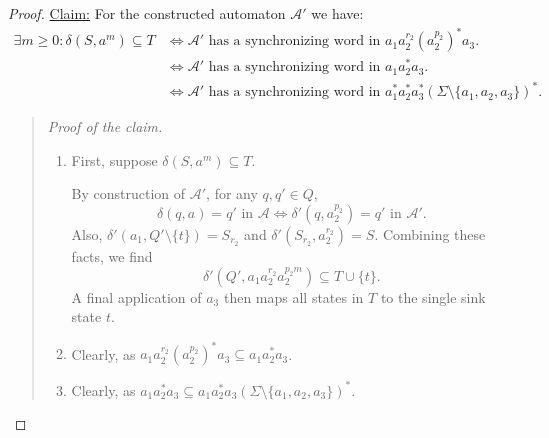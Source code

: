 \begin{proof}
\noindent\underline{Claim:} %
 For the constructed automaton $\mathcal A'$ we have:
\begin{align*} %
    \exists m \ge 0 : \delta(S, a^m) \subseteq T %
                               & \Leftrightarrow \mathcal A'\mbox{ has a synchronizing word in $a_1a_2^{r_2}(a_2^{p_2})^*a_3$.} \\
                               & \Leftrightarrow \mathcal A'\mbox{ has a synchronizing word in $a_1a_2^*a_3$.} \\
                               & \Leftrightarrow \mathcal A'\mbox{ has a synchronizing word in $a_1^*a_2^*a_3^*(\Sigma \setminus \{a_1, a_2, a_3\})^*$.}
\end{align*} %
%
%
\begin{quote}
 \emph{Proof of the claim.}
\begin{enumerate}
\item First, suppose $\delta(S, a^m) \subseteq T$.

 By construction of $\mathcal A'$,
 for any $q, q' \in Q$,
 \begin{equation}\label{eqn:transition_Astar}
  \delta(q, a) = q'  \mbox{ in $\mathcal A$}  \Leftrightarrow \delta'(q, a_2^{p_2}) = q'  \mbox{ in $\mathcal A'$} .
 \end{equation}
 Also, $\delta'(a_1, Q'\setminus\{t\}) = S_{r_2}$
 and $\delta'(S_{r_2}, a_2^{r_2}) = S$.
 Combining these facts, we find
 \[
  \delta'(Q', a_1a_2^{r_2}a_2^{p_2m}) \subseteq T \cup \{t\}. 
 \]
 A final application of $a_3$ then maps
 all states in $T$ to the single sink %
 state $t$.
 
\item Clearly, as $a_1a_2^{r_2}(a_2^{p_2})^*a_3 \subseteq a_1 a_2^* a_3$.

\item Clearly, as $a_1 a_2^* a_3 \subseteq a_1 a_2^* a_3(\Sigma\setminus\{a_1,a_2,a_3\})^*$.


\end{enumerate}
\end{quote}
\end{proof}
